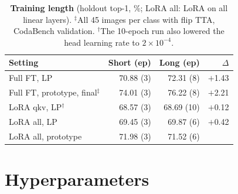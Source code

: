 \begin{table}[H]
  \caption{\textbf{Training length} (holdout top-1, \%; LoRA all: LoRA on all linear layers).
  $^\ddagger$All 45 images per class with flip TTA, CodaBench validation.
  $^\dagger$The 10-epoch run also lowered the head learning rate to $2{\times}10^{-4}$.}
  \label{tab:length}
  \centering
  \footnotesize
  \setlength{\tabcolsep}{5pt}
  \begin{tabular}{@{}lrrr@{}}
    \toprule
    Setting & Short (ep) & Long (ep) & $\Delta$ \\
    \midrule
    Full FT, LP & 70.88 (3) & 72.31 (8) & $+$1.43 \\
    Full FT, prototype, final$^\ddagger$ & 74.01 (3) & 76.22 (8) & $+$2.21 \\
    LoRA qkv, LP$^\dagger$ & 68.57 (3) & 68.69 (10) & $+$0.12 \\
    LoRA all, LP & 69.45 (3) & 69.87 (6) & $+$0.42 \\
    LoRA all, prototype & 71.98 (3) & 71.52 (6) & \minus0.46 \\
    \bottomrule
  \end{tabular}
\end{table}

\section{Hyperparameters}
\label{sec:hparams}

